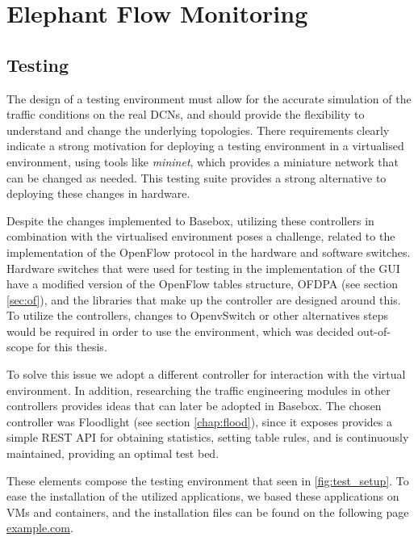 \chapter{Elephant Flow Monitoring} \label{chap:me} 

\section {Testing}

The design of a testing environment must allow for the accurate simulation of the traffic conditions on the real DCNs, and should provide the flexibility to 
understand and change the underlying topologies. There requirements clearly indicate a strong motivation for deploying a testing environment in a virtualised
environment, using tools like \textit{mininet}, which provides a miniature network that can be changed as needed. This testing suite provides a strong 
alternative to deploying these changes in hardware.

\par Despite the changes implemented to Basebox, utilizing these controllers in combination with the virtualised environment poses a challenge, related 
to the implementation of the OpenFlow protocol in the hardware and software switches. Hardware switches that were used for testing in the implementation of
the GUI have a modified version of the OpenFlow tables structure, OFDPA (see section \ref{sec:of}), and the libraries that make up the 
controller are designed around this. To utilize the controllers, changes to OpenvSwitch or other alternatives steps would be required in order to use the environment,
which was decided out-of-scope for this thesis.

\par To solve this issue we adopt a different controller for interaction with the virtual environment. In addition, researching the traffic engineering modules in
other controllers provides ideas that can later be adopted in Basebox. The chosen controller was Floodlight (see section \ref{chap:flood}), since it exposes
provides a simple REST API for obtaining statistics, setting table rules, and is continuously maintained, providing an optimal test bed.

\par These elements compose the testing environment that seen in \ref{fig:test_setup}. To ease the installation of the utilized applications, 
we based these applications on VMs and containers, and the installation files can be found on the following page \url {example.com}.


